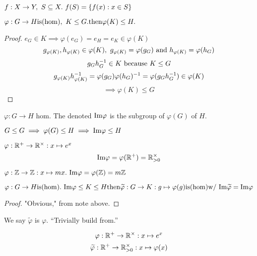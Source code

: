 \documentclass[12pt]{article}
\newcommand\im{\TR{Im}}
\newcommand\vphi{\varphi}
\begin{document}
\bboxnota
\begin{nota}
    \(f:X\to Y,\ S\subseteq X.\ f(S)=\{f(x):x\in S\}\)
\end{nota}
\ebox

\bboxprop
\begin{prop}
    \(\vphi:G\to H\is\TM{hom},\ K\le G.\tthen \vphi(K)\le H.\)
\end{prop}
\ebox

\bboxproof
\begin{proof}
    \(e_G\in K\implies\vphi(e_G)=e_H=e_K\in\vphi(K)\)
    \[
        g_{\vphi(K)},h_{\vphi(K)}\in\vphi(K),\ g_{\vphi(K)}=\vphi(g_G)\nd h_{\vphi(K)}=\vphi(h_G)
    \]
    \[
        g_Gh^{-1}_G\in K\text{ because }K\le G
    \]
    \[
        g_{\vphi(K)}\inv h_{\vphi(K)}=\vphi(g_G)\vphi(h_G)^{-1}
        =\vphi(g_G\inv h_G)\in\vphi(K)
    \]
    \[
        \implies\vphi(K)\le G
    \]
\end{proof}
\ebox

\bboxdefn
\begin{defn}[Image]
    \(\vphi:G\to H\) hom. The  denoted \(\im\vphi\) is the subgroup
    of \(\vphi(G)\) of \(H\).
\end{defn}
\ebox
\bboxnote
\begin{note}
    \(G\le G\implies \vphi(G)\le H\implies\im\vphi\le H\)
\end{note}
\ebox


\bboxexam
\begin{exam}
    \(\vphi:\R^+\to\R^\times:x\mapsto e^x\)
    \[
        \im\vphi=\vphi(\R^+)=\R_{>0}^\times
    \]
\end{exam}
\ebox

\bboxexam
\begin{exam}
    \(\vphi:\Z\to\Z:x\mapsto mx.\ \im\vphi=\vphi(\Z)=m\Z\)
\end{exam}
\ebox

\bboxlem
\begin{lem}
    \(\vphi:G\to H\is\TM{hom}.\ \im\vphi\le K\le H\tthen\widetilde\vphi:G\to K
    :g\mapsto\vphi(g)\is\TM{hom}\T{w/ }\im\widetilde\vphi=\im\vphi\)
\end{lem}
\ebox

\bboxproof
\begin{proof}
    "Obvious," from note above.
\end{proof}
\ebox
We say \(\widetilde\vphi\) is \(\vphi\). ``Trivially build from.''

\bboxexam
\begin{exam}
    \[
        \vphi : \R^+ \to \R^\times      : x \mapsto e^x
    \]
    \[
        \widetilde
        \vphi : \R^+ \to \R^\times_{>0} : x \mapsto \vphi(x)
    \]
\end{exam}
\ebox
\end{document}
